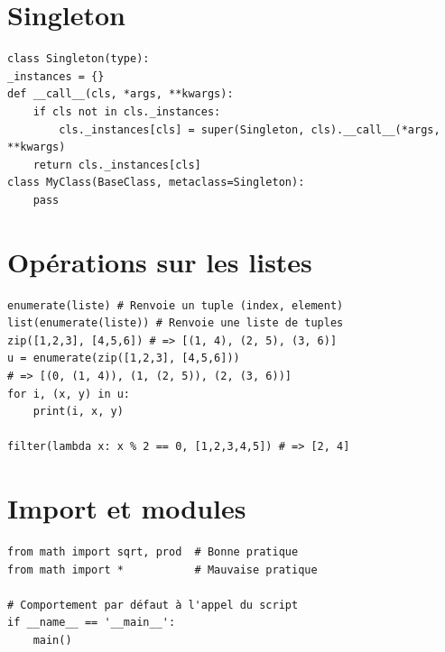 \documentclass{article}
\begin{document}
\begin{multicols*}{4}
\begin{lstlisting}
\end{lstlisting}

\section*{Singleton}
\begin{lstlisting}
class Singleton(type):
_instances = {}
def __call__(cls, *args, **kwargs):
    if cls not in cls._instances:
        cls._instances[cls] = super(Singleton, cls).__call__(*args, **kwargs)
    return cls._instances[cls]
class MyClass(BaseClass, metaclass=Singleton):
    pass
\end{lstlisting}

\section*{Opérations sur les listes}
\begin{lstlisting}
enumerate(liste) # Renvoie un tuple (index, element)
list(enumerate(liste)) # Renvoie une liste de tuples
zip([1,2,3], [4,5,6]) # => [(1, 4), (2, 5), (3, 6)]
u = enumerate(zip([1,2,3], [4,5,6])) 
# => [(0, (1, 4)), (1, (2, 5)), (2, (3, 6))]
for i, (x, y) in u:
    print(i, x, y)

filter(lambda x: x % 2 == 0, [1,2,3,4,5]) # => [2, 4]
\end{lstlisting}

\section*{Import et modules}
\begin{lstlisting}
from math import sqrt, prod  # Bonne pratique
from math import *           # Mauvaise pratique

# Comportement par défaut à l'appel du script
if __name__ == '__main__':
    main()
\end{lstlisting}


\end{multicols*}
\end{document}
